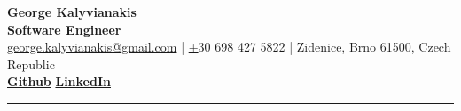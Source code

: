 \documentclass[]{deedy-resume-reversed}
\begin{document}
%
%
\begin{flushleft}
{\fontsize{24}{8}\selectfont \textbf{George Kalyvianakis}}\\
{\textcolor{subheading_gray}{\fontsize{16}{8}\selectfont \textbf{Software Engineer}}} \\
\vspace{6pt}
\href{mailto:george.kalyvianakis@gmail.com}{george.kalyvianakis@gmail.com} | \href{tel:+30 6984275822}+30 698 427 5822 | Zidenice, Brno 61500, Czech Republic \\
\vspace{3pt}
\href{https://github.com/CptGeo}{\bf Github} \textbullet{}
\href{https://www.linkedin.com/in/george-kalyvianakis/}{\bf LinkedIn} \\
\vspace{3pt}

\end{flushleft}

\hrule height 0.5pt
\vspace{3pt}

%
%
\end{document}
